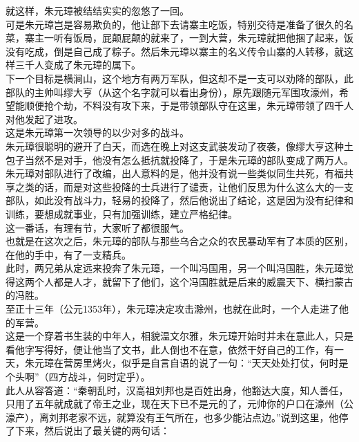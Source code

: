 \begin{multicols}{\theparacolNo}
就这样，朱元璋被结结实实的忽悠了一回。\\

可是朱元璋岂是容易欺负的，他让部下去请寨主吃饭，特别交待是准备了很久的名菜，寨主一听有饭局，屁颠屁颠的就来了，一到大营，朱元璋就把他捆了起来，饭没有吃成，倒是自己成了粽子。然后朱元璋以寨主的名义传令山寨的人转移，就这样三千人变成了朱元璋的属下。\\

下一个目标是横涧山，这个地方有两万军队，但这却不是一支可以劝降的部队，此部队的主帅叫缪大亨（从这个名字就可以看出身份），原先跟随元军围攻濠州，希望能顺便抢个劫，不料没有攻下来，于是带领部队守在这里，朱元璋带领了四千人对他发起了进攻。\\

这是朱元璋第一次领导的以少对多的战斗。\\

朱元璋很聪明的避开了白天，而选在晚上对这支武装发动了夜袭，像缪大亨这种土包子当然不是对手，他没有怎么抵抗就投降了，于是朱元璋的部队变成了两万人。\\

朱元璋对部队进行了改编，出人意料的是，他并没有说一些类似同生共死，有福共享之类的话，而是对这些投降的士兵进行了谴责，让他们反思为什么这么大的一支部队，如此没有战斗力，轻易的投降了，然后他说出了结论，这是因为没有纪律和训练，要想成就事业，只有加强训练，建立严格纪律。\\

这一番话，有理有节，大家听了都很服气。\\

也就是在这次之后，朱元璋的部队与那些乌合之众的农民暴动军有了本质的区别，在他的手中，有了一支精兵。\\

此时，两兄弟从定远来投奔了朱元璋，一个叫冯国用，另一个叫冯国胜，朱元璋觉得这两个人都是人才，就留下了他们，这个冯国胜就是后来的威震天下、横扫蒙古的冯胜。\\

至正十三年（公元1353年），朱元璋决定攻击滁州，也就在此时，一个人走进了他的军营。\\

这是一个穿着书生装的中年人，相貌温文尔雅，朱元璋开始时并未在意此人，只是看他字写得好，便让他当了文书，此人倒也不在意，依然干好自己的工作，有一天，朱元璋在营房里烤火，似乎是自言自语的说了一句：“天天处处打仗，何时是个头啊”（四方战斗，何时定乎）。\\

此人从容答道：“秦朝乱时，汉高祖刘邦也是百姓出身，他豁达大度，知人善任，只用了五年就成就了帝王之业，现在天下已不是元的了，元帅你的户口在濠州（公濠产），离刘邦老家不远，就算没有王气所在，也多少能沾点边。”说到这里，他停了下来，然后说出了最关键的两句话：\\


\end{multicols}
